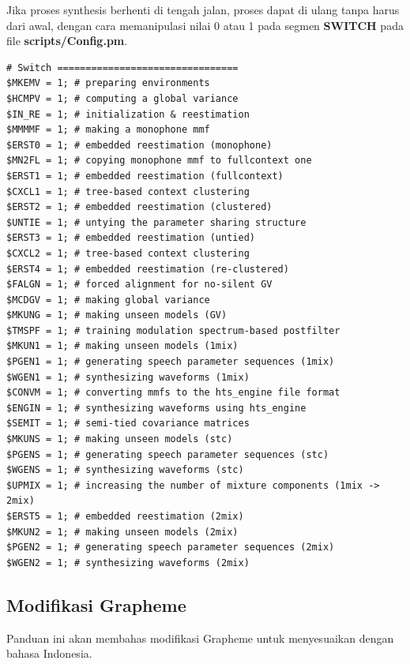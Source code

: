 \documentclass[12pt,]{article}
\begin{document}
	Jika proses synthesis berhenti di tengah jalan, proses dapat di ulang tanpa harus dari awal,
	dengan cara memanipulasi nilai 0 atau 1 pada segmen \textbf{SWITCH} pada file \textbf{scripts/Config.pm}.
	
	\begin{verbatim}
# Switch ================================
$MKEMV = 1; # preparing environments
$HCMPV = 1; # computing a global variance
$IN_RE = 1; # initialization & reestimation
$MMMMF = 1; # making a monophone mmf
$ERST0 = 1; # embedded reestimation (monophone)
$MN2FL = 1; # copying monophone mmf to fullcontext one
$ERST1 = 1; # embedded reestimation (fullcontext)
$CXCL1 = 1; # tree-based context clustering
$ERST2 = 1; # embedded reestimation (clustered)
$UNTIE = 1; # untying the parameter sharing structure
$ERST3 = 1; # embedded reestimation (untied)
$CXCL2 = 1; # tree-based context clustering
$ERST4 = 1; # embedded reestimation (re-clustered)
$FALGN = 1; # forced alignment for no-silent GV
$MCDGV = 1; # making global variance
$MKUNG = 1; # making unseen models (GV)
$TMSPF = 1; # training modulation spectrum-based postfilter
$MKUN1 = 1; # making unseen models (1mix)
$PGEN1 = 1; # generating speech parameter sequences (1mix)
$WGEN1 = 1; # synthesizing waveforms (1mix)
$CONVM = 1; # converting mmfs to the hts_engine file format
$ENGIN = 1; # synthesizing waveforms using hts_engine
$SEMIT = 1; # semi-tied covariance matrices
$MKUNS = 1; # making unseen models (stc)
$PGENS = 1; # generating speech parameter sequences (stc)
$WGENS = 1; # synthesizing waveforms (stc)
$UPMIX = 1; # increasing the number of mixture components (1mix -> 2mix)
$ERST5 = 1; # embedded reestimation (2mix)
$MKUN2 = 1; # making unseen models (2mix)
$PGEN2 = 1; # generating speech parameter sequences (2mix)
$WGEN2 = 1; # synthesizing waveforms (2mix)
	\end{verbatim}

	\newpage
	\subsection{Modifikasi Grapheme}
	
	Panduan ini akan membahas modifikasi Grapheme untuk menyesuaikan dengan bahasa Indonesia.
	
\end{document}
